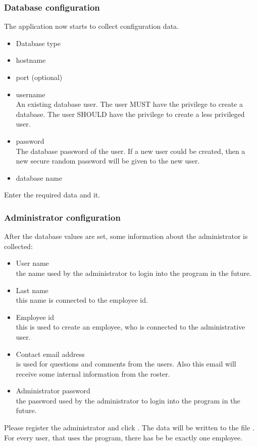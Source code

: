 \subsubsection{Database configuration}
The application now starts to collect configuration data.
\begin{itemize}
\item Database type
\item hostname
\item port (optional)
\item username \\An existing database user. The user MUST have the privilege to create a database. The user SHOULD have the privilege to create a less privileged user.
\item password \\The database password of the user. If a new user could be created, then a new secure random password will be given to the new user.
\item database name
\end{itemize}
Enter the required data and  it.
\subsubsection{Administrator configuration}
After the database values are set, some information about the administrator is collected:
\begin{itemize}
\item User name\\ the name used by the administrator to login into the program in the future. 
\item Last name\\ this name is connected to the employee id.
\item Employee id\\ this is used to create an employee, who is connected to the administrative user.
\item Contact email address\\ is used for questions and comments from the users. Also this email will receive some internal information from the roster.
\item Administrator password\\ the password used by the administrator to login into the program in the future. 
\end{itemize}
Please register the administrator and click .
The data will be written to the file .
For every user, that uses the program, there has be be exactly one employee. 
